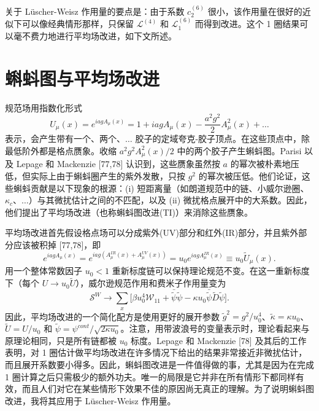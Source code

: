 关于 L\"uscher-Weisz 作用量的要点是：由于系数 $c_2^{(6)}$ 很小，该作用量在很好的近似下可以像经典情形那样，只保留 $\mathcal{L}^{(4)}$ 和 $\mathcal{L}_1^{(6)}$ 而得到改进。这个 1 圈结果可以毫不费力地进行平均场改进，如下文所述。

\section{蝌蚪图与平均场改进}

规范场用指数化形式
\begin{equation}
U_\mu(x) = e^{iagA_\mu(x)} = 1 + iagA_\mu(x)
    - \frac{a^2g^2}{2}A_\mu^2(x) + \ldots
\end{equation}
表示，会产生带有一个、两个、$\ldots$ 胶子的定域夸克-胶子顶点。在这些顶点中，除最低阶外都是格点赝象。收缩 $a^2g^2A_\mu^2(x)/2$ 中的两个胶子产生蝌蚪图。Parisi 以及 Lepage 和 Mackenzie [77,78] 认识到，这些赝象虽然按 $a$ 的幂次被朴素地压低，但实际上由于蝌蚪圈产生的紫外发散，只按 $g^2$ 的幂次被压低。他们论证，这些蝌蚪贡献是以下现象的根源：(i) 短距离量（如朗道规范中的链、小威尔逊圈、$\kappa_c$、$\ldots$）与其微扰估计之间的不匹配，以及 (ii) 微扰格点展开中的大系数。因此，他们提出了平均场改进（也称蝌蚪图改进(TI)）来消除这些赝象。

平均场改进首先假设格点场可以分成紫外(UV)部分和红外(IR)部分，并且紫外部分应该被积掉 [77,78]，即
\begin{equation}
e^{iagA_\mu(x)} = e^{iag(A_\mu^{IR}(x)+A_\mu^{UV}(x))}
    = u_0 e^{iagA_\mu^{IR}(x)} \equiv u_0 \tilde U_\mu(x).
\end{equation}
用一个整体常数因子 $u_0 < 1$ 重新标度链可以保持理论规范不变。在这一重新标度下（每个 $U \to u_0 \tilde U$），威尔逊规范作用和费米子作用量变为
\begin{equation}
\mathcal{S}^W \to \sum_x \bigg[\beta u_0^4\mathcal{W}_{11}
    + \bar{\tilde\psi}\tilde\psi
    - \kappa u_0 \bar{\tilde\psi}\tilde D\tilde\psi\bigg].
\end{equation}
因此，平均场改进的一个简化配方是使用更好的展开参数 $\tilde g^2 = g^2/u_0^4$、$\tilde\kappa =
\kappa u_0$、$\tilde U = U/u_0$ 和 $\tilde\psi =
\psi^{cont}/\sqrt{2\kappa u_0}$。注意，用带波浪号的变量表示时，理论看起来与原理论相同，只是所有链都被 $u_0$ 标度。Lepage 和 Mackenzie [78] 及其后的工作表明，对 1 圈估计做平均场改进在许多情况下给出的结果非常接近非微扰估计，而且展开系数要小得多。因此，蝌蚪图改进是一件值得做的事，尤其是因为在完成 1 圈计算之后只需极少的额外功夫。唯一的局限是它并非在所有情形下都同样有效，而且人们对它在某些情形下效果不佳的原因尚无真正的理解。为了说明蝌蚪图改进，我将其应用于 L\"uscher-Weisz 作用量。

